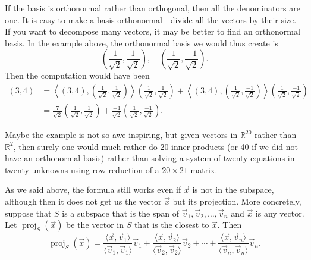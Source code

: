 If the basis is orthonormal rather than orthogonal,
then all the denominators are one.
It is easy to make a basis orthonormal---divide all the vectors by their size.
If you want to decompose many vectors,
it may be better to find an orthonormal basis.
In the example above, the orthonormal basis we would thus create is
\begin{equation*}
\left( \frac{1}{\sqrt{2}} , \frac{1}{\sqrt{2}} \right) , \quad
\left( \frac{1}{\sqrt{2}} , \frac{-1}{\sqrt{2}} \right) .
\end{equation*}
Then the computation would have been
\begin{equation*}
\begin{split}
(3,4)
& =
\left\langle
(3,4)
,
\left( \frac{1}{\sqrt{2}} , \frac{1}{\sqrt{2}} \right)
\right\rangle
\left( \frac{1}{\sqrt{2}} , \frac{1}{\sqrt{2}} \right)
+
\left\langle
(3,4)
,
\left( \frac{1}{\sqrt{2}} , \frac{-1}{\sqrt{2}} \right)
\right\rangle
\left( \frac{1}{\sqrt{2}} , \frac{-1}{\sqrt{2}} \right)
\\
& =
\frac{7}{\sqrt{2}}
\left( \frac{1}{\sqrt{2}} , \frac{1}{\sqrt{2}} \right)
+
\frac{-1}{\sqrt{2}}
\left( \frac{1}{\sqrt{2}} , \frac{-1}{\sqrt{2}} \right) .
\end{split}
\end{equation*}

Maybe the example is not so awe inspiring, but given
vectors in ${\mathbb{R}}^{20}$ rather than ${\mathbb{R}}^2$,
then surely one would much rather do 20 inner products
(or 40 if we did not have an orthonormal basis) rather than
solving a system of twenty equations in twenty unknowns
using row reduction of a $20 \times 21$ matrix.

As we said above, the formula still works even if $\vec{x}$ is not in the
subspace, although then it does not get us the vector $\vec{x}$
but its projection.  More concretely, suppose that $S$ is a subspace
that is the span of $\vec{v}_1,\vec{v}_2,\ldots,\vec{v}_n$ and $\vec{x}$
is any vector.  Let $\operatorname{proj}_{S}(\vec{x})$ be the vector in $S$
that is the closest to $\vec{x}$.  Then
\begin{equation*}
\operatorname{proj}_{S}(\vec{x}) = 
\frac{\langle \vec{x}, \vec{v}_1 \rangle}{
\langle \vec{v}_1, \vec{v}_1 \rangle
}
\vec{v}_1
+
\frac{\langle \vec{x}, \vec{v}_2 \rangle}{
\langle \vec{v}_2, \vec{v}_2 \rangle
}
\vec{v}_2
+
\cdots
+
\frac{\langle \vec{x}, \vec{v}_n \rangle}{
\langle \vec{v}_n, \vec{v}_n \rangle
}
\vec{v}_n .
\end{equation*}

